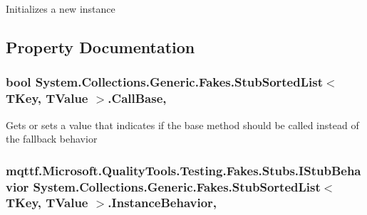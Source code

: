Initializes a new instance



\subsection{Property Documentation}
\hypertarget{class_system_1_1_collections_1_1_generic_1_1_fakes_1_1_stub_sorted_list_3_01_t_key_00_01_t_value_01_4_abe74b2ab6dc14cd5e17097be45e223a2}{
\subsubsection[{Call\-Base}]{\setlength{\rightskip}{0pt plus 5cm}bool System.\-Collections.\-Generic.\-Fakes.\-Stub\-Sorted\-List$<$ T\-Key, T\-Value $>$.Call\-Base\hspace{0.3cm}{\ttfamily [get]}, {\ttfamily [set]}}}\label{class_system_1_1_collections_1_1_generic_1_1_fakes_1_1_stub_sorted_list_3_01_t_key_00_01_t_value_01_4_abe74b2ab6dc14cd5e17097be45e223a2}


Gets or sets a value that indicates if the base method should be called instead of the fallback behavior

\hypertarget{class_system_1_1_collections_1_1_generic_1_1_fakes_1_1_stub_sorted_list_3_01_t_key_00_01_t_value_01_4_a7b7be1939163ccb848167664711e91eb}{
\subsubsection[{Instance\-Behavior}]{\setlength{\rightskip}{0pt plus 5cm}mqttf.\-Microsoft.\-Quality\-Tools.\-Testing.\-Fakes.\-Stubs.\-I\-Stub\-Behavior System.\-Collections.\-Generic.\-Fakes.\-Stub\-Sorted\-List$<$ T\-Key, T\-Value $>$.Instance\-Behavior\hspace{0.3cm}{\ttfamily [get]}, {\ttfamily [set]}}}\label{class_system_1_1_collections_1_1_generic_1_1_fakes_1_1_stub_sorted_list_3_01_t_key_00_01_t_value_01_4_a7b7be1939163ccb848167664711e91eb}


